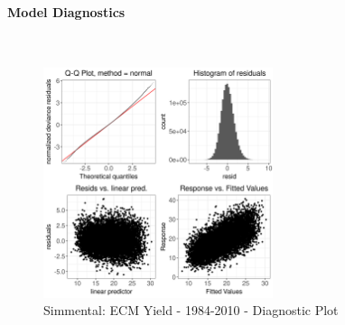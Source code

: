 \paragraph{Model Diagnostics} \quad \\
\begin{figure}[H]
    \centering
    \includegraphics[width=0.6\textwidth]{thesis/figures/models/ecm/before2010/si_ecm_before2010/si_ecm_before2010_diagnostics.png}
    \caption[]{Simmental: ECM Yield - 1984-2010 - Diagnostic Plot}
\end{figure}

\newpage
